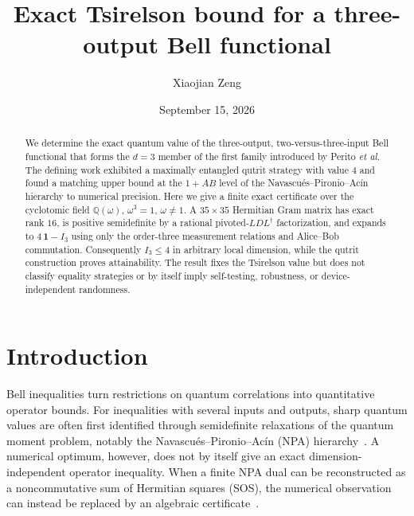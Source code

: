 \documentclass[aps,pra,reprint,superscriptaddress,nofootinbib,longbibliography]{revtex4-2}
\newcommand{\id}{\mathbf{1}}
\newcommand{\Q}{\mathbb{Q}}
\begin{document}
\title{Exact Tsirelson bound for a three-output Bell functional}

\author{Xiaojian Zeng}

\date{September 15, 2026}

\begin{abstract}
We determine the exact quantum value of the three-output, two-versus-three-input
Bell functional that forms the $d=3$ member of the first family introduced by
Perito \textit{et al.}  The defining work exhibited a maximally entangled
qutrit strategy with value $4$ and found a matching upper bound at the
$1+AB$ level of the Navascu\'es--Pironio--Ac\'in hierarchy to numerical
precision.  Here we give a finite exact certificate over the cyclotomic field
$\Q(\omega)$, $\omega^3=1$, $\omega\ne1$.  A $35\times35$ Hermitian Gram
matrix has exact rank $16$, is positive semidefinite by a rational
pivoted-$LDL^\dagger$ factorization, and expands to $4\,\id-I_3$ using only the
order-three measurement relations and Alice--Bob commutation.  Consequently
$I_3\leq4$ in arbitrary local dimension, while the qutrit construction proves
attainability.  The result fixes the Tsirelson value but does not classify
equality strategies or by itself imply self-testing, robustness, or
device-independent randomness.
\end{abstract}

\maketitle

\section{Introduction}

Bell inequalities turn restrictions on quantum correlations into quantitative
operator bounds.  For inequalities with several inputs and outputs, sharp
quantum values are often first identified through semidefinite relaxations of
the quantum moment problem, notably the Navascu\'es--Pironio--Ac\'in (NPA)
hierarchy~\cite{NPA2007,NPA2008,Doherty2008}.  A numerical optimum, however,
does not by itself give an exact dimension-independent operator inequality.
When a finite NPA dual can be reconstructed as a noncommutative
sum of Hermitian squares (SOS), the numerical observation can instead be
replaced by an algebraic certificate~\cite{Helton2002}.
\end{document}

